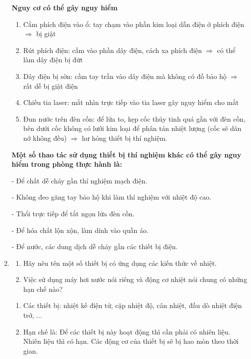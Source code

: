 \begin{enumerate}[label=\bfseries Câu \arabic*:]
	\hideall
	{	
		\textbf{Nguy cơ có thể gây nguy hiểm}
		\begin{enumerate}[label=\alph*)]
			\item Cắm phích điện vào ổ: tay chạm vào phần kim loại dẫn điện ở phích điện $\Rightarrow$ bị giật
			
			\item Rút phích điện: cầm vào phần dây điện, cách xa phích điện $\Rightarrow$ có thể làm dây điện bị đứt
			
			\item Dây điện bị sờn: cầm tay trần vào dây điện mà không có đồ bảo hộ $\Rightarrow$ rất dễ bị giật điện
			
			\item Chiếu tia laser: mắt nhìn trực tiếp vào tia laser gây nguy hiểm cho mắt
			
			\item Đun nước trên đèn cồn: để lửa to, kẹp cốc thủy tinh quá gần với đèn cồn, bên dưới cốc không có lưới kim loại để phân tán nhiệt lượng (cốc sẽ dãn nở không đều) $\Rightarrow$ hư hỏng thiết bị thí nghiệm.
		\end{enumerate}
		
		\textbf{Một số thao tác sử dụng thiết bị thí nghiệm khác có thể gây nguy hiểm trong phòng thực hành là:}
		
		- Để chất dễ cháy gần thí nghiệm mạch điện.
		
		- Không đeo găng tay bảo hộ khi làm thí nghiệm với nhiệt độ cao.
		
		- Thổi trực tiếp để tắt ngọn lửa đèn cồn.
		
		- Để hóa chất lộn xộn, làm dính vào quần áo.
		
		- Để nước, các dung dịch dễ cháy gần các thiết bị điện.
		
		
	}
	\item {}
	
	
	{
		\begin{enumerate}[label=\alph*)]
			\item Hãy nêu tên một số thiết bị có ứng dụng các kiến thức về nhiệt.
			\item Việc sử dụng máy hơi nước nói riêng và động cơ nhiệt nói chung có những hạn chế nào?
		\end{enumerate}
	}
	
	\hideall
	{	
		\begin{enumerate}[label=\alph*)]
			\item Các thiết bị: nhiệt kế điện tử, cặp nhiệt độ, cân nhiệt, đầu dò nhiệt điện trở, ...
			\item Hạn chế là: Để các thiết bị này hoạt động thì cần phải có nhiên liệu. Nhiên liệu thì có hạn. Các động cơ của thiết bị sẽ bị hao mòn theo thời gian.
		\end{enumerate}
	}


\end{enumerate}
